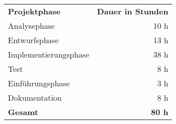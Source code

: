 \begin{tabular}{lr}
\rowcolor{heading}\textbf{Projektphase} & \textbf{Dauer in Stunden} \\
Analysephase & 10 h \\
\rowcolor{odd}Entwurfsphase & 13 h \\
Implementierungsphase & 38 h \\
\rowcolor{odd}Test & 8 h \\
Einführungsphase & 3 h \\
\rowcolor{odd}Dokumentation & 8 h \\
\hline
\hline
\rowcolor{odd}\textbf{Gesamt} & \textbf{80 h} \\
\end{tabular}
